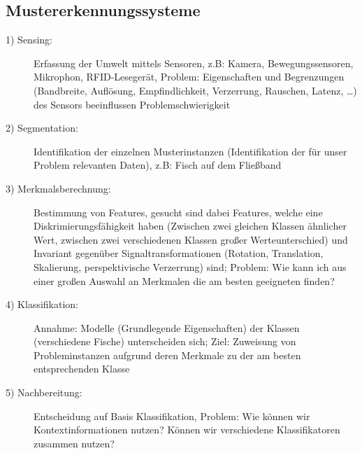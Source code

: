 \documentclass{article} %
\begin{document}
	\subsection{Mustererkennungssysteme}
		\begin{description}
			\item[1) Sensing:] Erfassung der Umwelt mittels Sensoren, z.B: Kamera, Bewegungssensoren, Mikrophon, RFID-Lesegerät, Problem: Eigenschaften und Begrenzungen (Bandbreite, Auflösung, Empfindlichkeit, Verzerrung, Rauschen, Latenz, \dots) des Sensors beeinflussen Problemschwierigkeit 			
			\item[2) Segmentation:] Identifikation der einzelnen Musterinstanzen (Identifikation der für unser Problem relevanten Daten), z.B: Fisch auf dem Fließband
			\item[3) Merkmalsberechnung:] Bestimmung von Features, gesucht sind dabei Features, welche eine Diskrimierungsfähigkeit haben (Zwischen zwei gleichen Klassen ähnlicher Wert, zwischen zwei verschiedenen Klassen großer Werteunterschied) und Invariant gegenüber Signaltransformationen (Rotation, Translation, Skalierung, perspektivische Verzerrung) sind; Problem: Wie kann ich aus einer großen Auswahl an Merkmalen die am besten geeigneten finden?
			\item[4) Klassifikation:] Annahme: Modelle (Grundlegende Eigenschaften) der Klassen (verschiedene Fische) unterscheiden sich; Ziel: Zuweisung von Probleminstanzen aufgrund deren Merkmale zu der am besten entsprechenden Klasse			
			\item[5) Nachbereitung:] Entscheidung auf Basis Klassifikation, Problem: Wie können wir Kontextinformationen nutzen? Können wir verschiedene Klassifikatoren zusammen nutzen? 
		\end{description}
\end{document}
